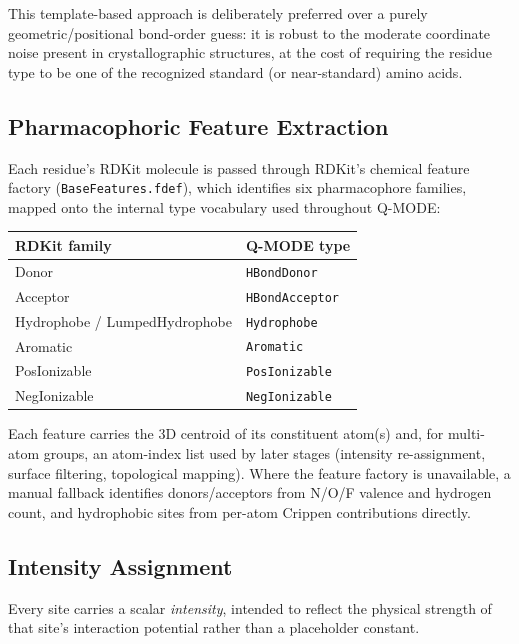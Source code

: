 \documentclass[11pt,a4paper]{article}
\begin{document}
This template-based approach is deliberately preferred over a purely geometric/positional bond-order guess: it is robust to the moderate coordinate noise present in crystallographic structures, at the cost of requiring the residue type to be one of the recognized standard (or near-standard) amino acids.

\subsection{Pharmacophoric Feature Extraction}
\label{sec:feature-extraction}

Each residue's RDKit molecule is passed through RDKit's chemical feature factory (\texttt{BaseFeatures.fdef}), which identifies six pharmacophore families, mapped onto the internal type vocabulary used throughout Q-MODE:

\begin{center}
\begin{tabular}{ll}
\toprule
\textbf{RDKit family} & \textbf{Q-MODE type} \\
\midrule
Donor & \texttt{HBondDonor} \\
Acceptor & \texttt{HBondAcceptor} \\
Hydrophobe / LumpedHydrophobe & \texttt{Hydrophobe} \\
Aromatic & \texttt{Aromatic} \\
PosIonizable & \texttt{PosIonizable} \\
NegIonizable & \texttt{NegIonizable} \\
\bottomrule
\end{tabular}
\end{center}

Each feature carries the 3D centroid of its constituent atom(s) and, for multi-atom groups, an atom-index list used by later stages (intensity re-assignment, surface filtering, topological mapping). Where the feature factory is unavailable, a manual fallback identifies donors/acceptors from N/O/F valence and hydrogen count, and hydrophobic sites from per-atom Crippen contributions directly.

\subsection{Intensity Assignment}
\label{sec:intensity}

Every site carries a scalar \emph{intensity}, intended to reflect the physical strength of that site's interaction potential rather than a placeholder constant.
\end{document}
